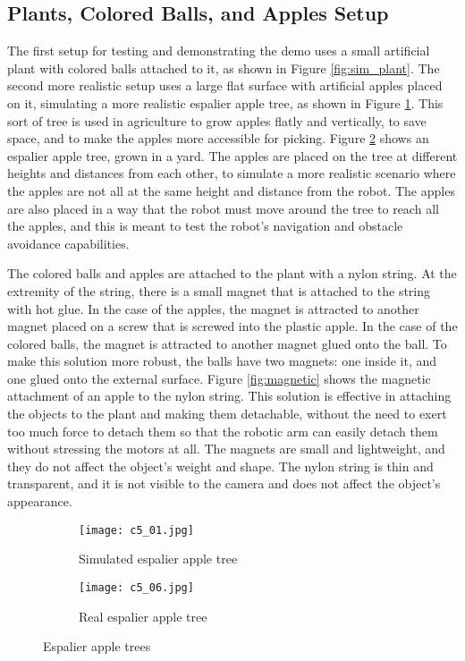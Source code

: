 \subsection{Plants, Colored Balls, and Apples Setup}

The first setup for testing and demonstrating the demo uses a small artificial plant with colored balls attached to it,
as shown in Figure \ref{fig:sim_plant}.
The second more realistic setup uses a large flat surface with artificial apples placed on it, simulating a more realistic
espalier apple tree, as shown in Figure \ref{fig:sim_espalier}.
This sort of tree is used in agriculture to grow apples flatly and vertically, to save space,
and to make the apples more accessible for picking. Figure \ref{fig:real_espalier} shows an espalier apple tree,
grown in a yard.
The apples are placed on the tree at different heights and distances
from each other, to simulate a more realistic scenario where the apples are not all at the same height and distance
from the robot. The apples are also placed in a way that the robot must move around the tree to reach all the apples,
and this is meant to test the robot's navigation and obstacle avoidance capabilities.

The colored balls and apples are attached to the plant with a nylon string. At the extremity of the string, there is a small
magnet that is attached to the string with hot glue. In the case of the apples, the magnet is attracted to another magnet
placed on a screw that is screwed into the plastic apple. In the case of the colored balls, the magnet is attracted
to another magnet glued onto the ball. To make this solution more robust, the balls have two magnets: one inside it,
and one glued onto the external surface. Figure \ref{fig:magnetic} shows the magnetic attachment of an apple to the nylon string.
This solution is effective in attaching the objects to the plant and making them detachable, 
without the need to exert too much force to detach them so that the robotic arm can easily detach them
without stressing the motors at all. The magnets are small and lightweight, and they do not affect the object's weight and shape.
The nylon string is thin and transparent, and it is not visible to the camera and does not affect the object's appearance.

\begin{figure}[t]
    \centering
    \begin{subfigure}{0.45\textwidth}
        \texttt{[image: c5\_01.jpg]}
        \caption{Simulated espalier apple tree}
        \label{fig:sim_espalier}
    \end{subfigure}
    \hfill %
    \begin{subfigure}{0.5\textwidth}
        \texttt{[image: c5\_06.jpg]}
        \caption{Real espalier apple tree}
        \label{fig:real_espalier}
    \end{subfigure}
    \caption{Espalier apple trees}
    \label{fig:plants}
\end{figure}

